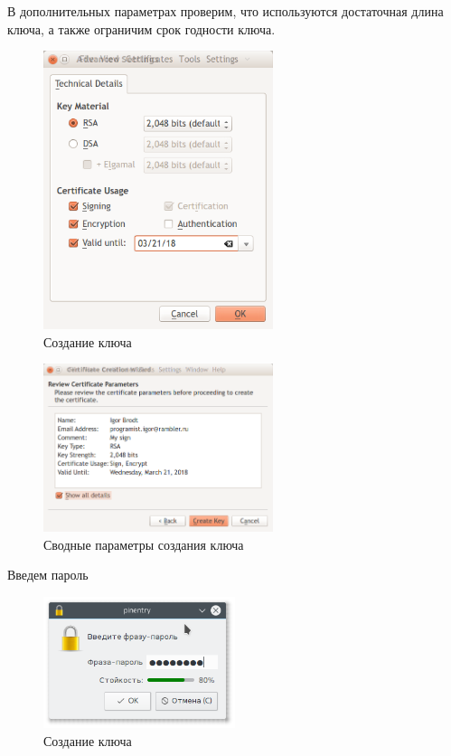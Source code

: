 В дополнительных параметрах проверим, что используются достаточная длина ключа, а также ограничим срок годности ключа.

\begin{figure}[H]
	\centering
	\includegraphics[width=0.6\textwidth]{images/4.png}
	\caption{Создание ключа}
\end{figure}

\begin{figure}[H]
	\centering
	\includegraphics[width=0.6\textwidth]{images/5.png}
	\caption{Сводные параметры создания ключа}
\end{figure}

Введем пароль

\begin{figure}[H]
	\centering
	\includegraphics[width=0.5\textwidth]{images/6.png}
	\caption{Создание ключа}
\end{figure}

